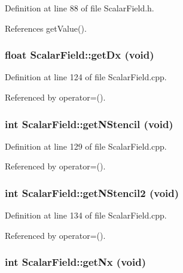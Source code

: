 Definition at line 88 of file ScalarField.h.



References getValue().

\subsubsection[{getDx}]{\setlength{\rightskip}{0pt plus 5cm}float ScalarField::getDx (void)}\label{classScalarField_a7d89f720e1e73257d853a3f782b6c34b}


Definition at line 124 of file ScalarField.cpp.



Referenced by operator=().

\subsubsection[{getNStencil}]{\setlength{\rightskip}{0pt plus 5cm}int ScalarField::getNStencil (void)}\label{classScalarField_aab10b08ed6cfa14163c6faf1086acc24}


Definition at line 129 of file ScalarField.cpp.



Referenced by operator=().

\subsubsection[{getNStencil2}]{\setlength{\rightskip}{0pt plus 5cm}int ScalarField::getNStencil2 (void)}\label{classScalarField_a77630e83e5e7e0bb67c6db08e32d7d39}


Definition at line 134 of file ScalarField.cpp.



Referenced by operator=().

\subsubsection[{getNx}]{\setlength{\rightskip}{0pt plus 5cm}int ScalarField::getNx (void)}\label{classScalarField_abd73cd609870a92c3611e81acfb557e3}


